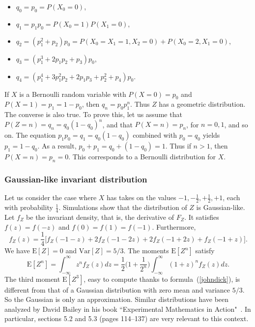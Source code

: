 \documentclass[oneside,10pt]{book}
\begin{document}
\begin{itemize}
\item $q_0 = p_0 =P(X_0=0)$,
\item $q_1 = p_1p_0 = P(X_0=1)P(X_1=0)$,
\item $q_2 = (p_1^2+p_2)p_0 =P(X_0=X_1=1, X_2=0)+P(X_0=2, X_1=0)$,
\item $q_3 = (p_1^3+2p_1p_2 +p_3)p_0$,
\item $q_4 = (p_1^4+ 3p_1^2p_2 + 2p_1p_3+p_2^2 + p_4)p_0$.
\end{itemize}\vspace{1ex}

\noindent If $X$ is a Bernoulli random variable with $P(X=0) = p_0$ and $P(X=1)=p_1 = 1-p_0$, then $q_n= p_0 p_1^n$. Thus
 $Z$ has a \textcolor{index}{geometric distribution}.
The converse is also true.
To prove this, let us assume that $P(Z = n) = q_n = q_0 (1 - q_0)^n$, and that $P(X = n) = p_n$, for $n = 0, 1$, and so on.
The equation $p_1p_0 = q_1 =  q_0(1-q_0)$ combined with $p_0 = q_0$ yields $p_1 = 1 - q_0$.
As a result, $p_0 + p_1 = q_0 + (1 - q_0) = 1$. Thus if $n > 1$, then $P(X = n) = p_n = 0$.
This corresponds to a Bernoulli distribution for $X$.

\subsubsection{Gaussian-like invariant distribution}

Let us consider the case where $X$ has takes on the values $-1,-\frac{1}{2},+\frac{1}{2},+1$, each with probability $\frac{1}{4}$.
Simulations show that the distribution of $Z$ is Gaussian-like. Let $f_Z$ be the invariant density, that is, the derivative of $F_Z$.
It satisfies $f(z) = f(-z)$ and $f(0)=f(1)=f(-1)$. Furthermore,
$$
f_Z(z)= \frac{1}{4} \Big[f_Z(-1-z) + 2f_Z(-1-2z) + 2f_Z(-1+2z) + f_Z(-1+z) \Big] .
$$
We have $\text{E}[Z]=0$ and $\text{Var}[Z]=5/3$. The moments $\text{E}[Z^n]$ satisfy
$$
\text{E}[Z^n] = \int_{-\infty}^\infty z^n f_Z(z)dz = \frac{1}{2}\Big(1+\frac{1}{2^n}\Big)\int_{-\infty}^\infty (1+z)^n f_Z(z)dz.
$$
The third moment $\text{E}[Z^3]$, easy to compute thanks to formula~(\ref{johndick}), is different from that of
 a Gaussian distribution with zero mean and variance $5/3$. So the Gaussian is only an approximation.
Similar distributions have been analyzed by David Bailey in his book ``Experimental Mathematics in Action"~\cite{nt1}. In particular, sections 5.2 and 5.3 (pages 114--137) are very relevant to this context.
\end{document}
